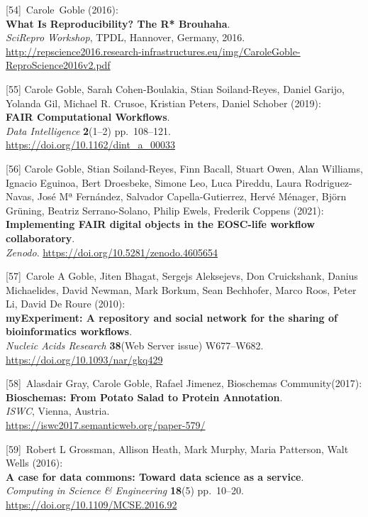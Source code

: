 {[}54{]}~Carole~Goble (2016):\\
\textbf{What Is Reproducibility? The R* Brouhaha}.\\
\emph{SciRepro Workshop}, TPDL, Hannover, Germany, 2016.
\url{http://repscience2016.research-infrastructures.eu/img/CaroleGoble-ReproScience2016v2.pdf}

{[}55{]} Carole Goble, Sarah Cohen-Boulakia, Stian Soiland-Reyes, Daniel
Garijo, Yolanda Gil, Michael R. Crusoe, Kristian Peters, Daniel Schober
(2019):\\
\textbf{FAIR Computational Workflows}.\\
\emph{Data Intelligence} \textbf{2}(1--2) pp.~108--121.\\
\url{https://doi.org/10.1162/dint_a_00033}

{[}56{]} Carole Goble, Stian Soiland-Reyes, Finn Bacall, Stuart Owen,
Alan Williams, Ignacio Eguinoa, Bert Droesbeke, Simone Leo, Luca
Pireddu, Laura Rodriguez-Navas, José Mª Fernández, Salvador
Capella-Gutierrez, Hervé Ménager, Björn Grüning, Beatriz Serrano-Solano,
Philip Ewels, Frederik Coppens (2021):\\
\textbf{Implementing FAIR digital objects in the EOSC-life workflow
collaboratory}.\\
\emph{Zenodo}. \url{https://doi.org/10.5281/zenodo.4605654}

{[}57{]}~Carole A Goble, Jiten Bhagat, Sergejs Aleksejevs, Don
Cruickshank, Danius Michaelides, David Newman, Mark Borkum, Sean
Bechhofer, Marco Roos, Peter Li, David De Roure (2010):\\
\textbf{myExperiment: A repository and social network for the sharing of
bioinformatics workflows}.\\
\emph{Nucleic Acids Research} \textbf{38}(Web Server issue)
W677--W682.\\
\url{https://doi.org/10.1093/nar/gkq429}

{[}58{]}~Alasdair Gray, Carole Goble, Rafael Jimenez, Bioschemas
Community(2017):\\
\textbf{Bioschemas: From Potato Salad to Protein Annotation}.\\
\emph{ISWC}, Vienna, Austria.\\
\url{https://iswc2017.semanticweb.org/paper-579/}

{[}59{]}~Robert L Grossman, Allison Heath, Mark Murphy, Maria Patterson,
Walt Wells (2016):\\
\textbf{A case for data commons: Toward data science as a service}.\\
\emph{Computing in Science \& Engineering} \textbf{18}(5) pp.~10--20.\\
\url{https://doi.org/10.1109/MCSE.2016.92}

